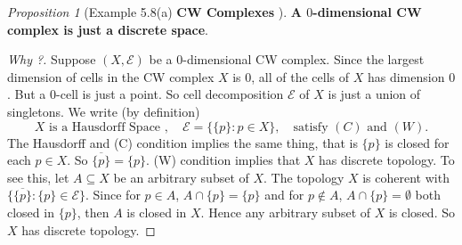\documentclass[a4paper]{article}
\theoremstyle{remark}
\newtheorem{prop}{Proposition}
\newcommand{\subhim}{\subseteq} %
\begin{document}
\begin{prop}[Example 5.8(a) \textbf{CW Complexes} \cite{LeeTM}]
\textbf{A $0$-dimensional CW complex is just a discrete space}.
\end{prop}
\begin{proof}[Why ?] 
	Suppose $(X,\mathcal{E})$ be a 0-dimensional CW complex. Since the largest dimension of cells in the CW complex $X$ is $0$, all of the cells of $X$ has dimension $0$. But a $0$-cell is just a point. So cell decomposition $\mathcal{E}$ of $X$ is just a union of singletons. We write (by definition)
	$$
	X \text{ is a Hausdorff Space }, \quad \mathcal{E} = \big\{ \{p\} : p \in X \big\}, \quad  \text{satisfy } (C) \text{ and }(W).
	$$
	The Hausdorff and (C) condition implies the same thing, that is $\{p\} $ is closed for each $p \in X$. So $\overline{\{p\}} = \{p\}$. (W) condition implies that $X$ has discrete topology. To see this, let $A \subhim X$ be an arbitrary subset of $X$. The topology $X$ is coherent with $\{ \overline{\{p\}} : \{p\} \in \mathcal{E} \}$. Since for $p \in A$, $A\cap\{p\} = \{p\}$ and for $p \notin A$, $A \cap \{p\} = \emptyset$ both closed in $\{p\}$, then $A$ is closed in $X$. Hence any arbitrary subset of $X$ is closed. So $X$ has discrete topology.   
\end{proof}
\end{document}
